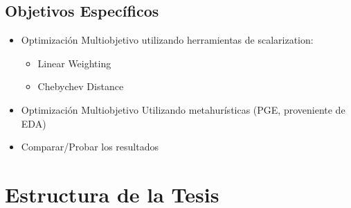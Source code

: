 \subsection*{Objetivos Espec\'ificos}
\begin{itemize}
    \item Optimizaci\'on Multiobjetivo utilizando herramientas de scalarization:
        \begin{itemize}
            \item Linear Weighting
            \item Chebychev Distance
        \end{itemize}
    \item Optimizaci\'on Multiobjetivo Utilizando metahur\'isticas (PGE, proveniente de EDA)
    \item Comparar/Probar los resultados
\end{itemize}

\section*{Estructura de la Tesis}
